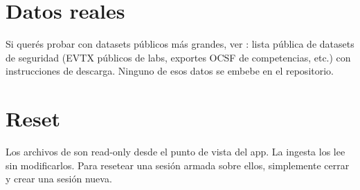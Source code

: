 \section{Datos reales}

Si querés probar con datasets públicos más grandes, ver
: lista pública de
datasets de seguridad (EVTX públicos de labs, exportes OCSF de
competencias, etc.) con instrucciones de descarga. Ninguno de esos
datos se embebe en el repositorio.

\section{Reset}

Los archivos de  son read-only desde el punto
de vista del app. La ingesta los lee sin modificarlos. Para
resetear una sesión armada sobre ellos, simplemente cerrar y
crear una sesión nueva.
